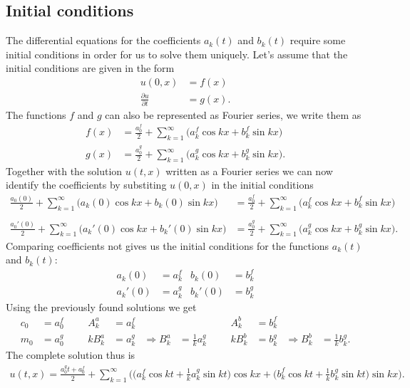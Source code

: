 \subsection{Initial conditions}
The differential equations for the coefficients $a_k(t)$ and $b_k(t)$
require some initial conditions in order for us to solve them uniquely.
Let's assume that the initial conditions are given in the form
\begin{align*}
u(0,x)&=f(x)\\
\frac{\partial u}{\partial t}&=g(x).
\end{align*}
The functions $f$ and $g$ can also be represented as Fourier series,
we write them as
\begin{align*}
f(x)&=\frac{a_0^f}2+\sum_{k=1}^\infty \bigl( a_k^f\cos kx+b_k^f\sin kx \bigr)\\
g(x)&=\frac{a_0^g}2+\sum_{k=1}^\infty \bigl( a_k^g\cos kx+b_k^g\sin kx \bigr).
\end{align*}
Together with the solution $u(t,x)$ written as a Fourier series 
we can now identify the coefficients by substiting $u(0,x)$ in
the initial conditions
\begin{align*}
\frac{a_0(0)}2+\sum_{k=1}^\infty \bigl( a_k(0)\cos kx +b_k(0)\sin kx \bigr)
&=
\frac{a_0^f}2+\sum_{k=1}^\infty \bigl( a_k^f\cos kx+b_k^f\sin kx \bigr)\\
\\
\frac{a_0'(0)}2+\sum_{k=1}^\infty \bigl( a_k'(0)\cos kx+b_k'(0)\sin kx \bigr)
&=
\frac{a_0^g}2+\sum_{k=1}^\infty \bigl( a_k^g\cos kx+b_k^g\sin kx \bigr).
\end{align*}
Comparing coefficients not gives us the initial conditions
for the functions $a_k(t)$ and $b_k(t)$:
\begin{align*}
a_k(0)&=a_k^f&b_k(0)&=b_k^f\\
a_k'(0)&=a_k^g&b_k'(0)&=b_k^g
\end{align*}
Using the previously found solutions we get
\begin{align*}
c_0&=a_0^f&&&A_k^a&=a_k^f&&&&&A_k^b&=b_k^f\\
m_0&=a_0^g&&&kB_k^a&=a_k^g&\Rightarrow B_k^a&=\frac1ka_k^g&&&kB_k^b&=b_k^g&\Rightarrow B_k^b&=\frac1kb_k^g.
\end{align*}
The complete solution thus is
\begin{align*}
u(t,x)=\frac{a_0^gt+a_0^f}2
+\sum_{k=1}^\infty \biggl(
\bigl(a_k^f\cos kt+{\textstyle\frac1k}a_k^g\sin kt\bigr)\cos kx
+
\bigl(b_k^f\cos kt+{\textstyle\frac1k}b_k^g\sin kt\bigr)\sin kx
\biggr).
\end{align*}

